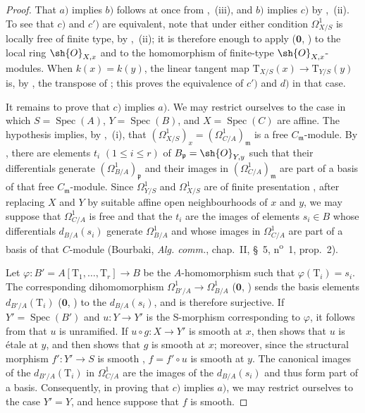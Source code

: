 \begin{proof}
That $a)$ implies $b)$ follows at once from ,~(iii), and $b)$ implies $c)$ by ,~(ii).
To see that $c)$ and $c')$ are equivalent, note that under either condition $\Omega^1_{X/S}$ is locally free of finite type, by ,~(ii); it is therefore enough to apply ($\mathbf{0}$, ) to the local ring $\sh{O}_{X,x}$ and to the homomorphism  of finite-type $\sh{O}_{X,x}$-modules.
When $k(x)=k(y)$, the linear tangent map $\mathrm{T}_{X/S}(x)\to\mathrm{T}_{Y/S}(y)$ is, by , the transpose of ; this proves the equivalence of $c')$ and $d)$ in that case.


It remains to prove that $c)$ implies $a)$.
We may restrict ourselves to the case in which $S=\operatorname{Spec}(A)$, $Y=\operatorname{Spec}(B)$, and $X=\operatorname{Spec}(C)$ are affine.
The hypothesis implies, by ,~(i), that
$(\Omega^1_{X/S})_x=(\Omega^1_{C/A})_{\mathfrak m}$ is a free $C_{\mathfrak m}$-module.
By , there are elements $t_i$ $(1\leq i\leq r)$ of
$B_{\mathfrak p}=\sh{O}_{Y,y}$ such that their differentials generate
$(\Omega^1_{B/A})_{\mathfrak p}$ and their images in
$(\Omega^1_{C/A})_{\mathfrak m}$ are part of a basis of that free $C_{\mathfrak m}$-module.
Since $\Omega^1_{Y/S}$ and $\Omega^1_{X/S}$ are of finite presentation , after replacing $X$ and $Y$ by suitable affine open neighbourhoods of $x$ and $y$, we may suppose that $\Omega^1_{C/A}$ is free and that the $t_i$ are the images of elements $s_i\in B$ whose differentials $d_{B/A}(s_i)$ generate $\Omega^1_{B/A}$ and whose images in $\Omega^1_{C/A}$ are part of a basis of that $C$-module (Bourbaki, \emph{Alg. comm.}, chap.~II, \S~5, n\textsuperscript{o}~1, prop.~2).

Let $\varphi:B'=A[\mathrm{T}_1,\ldots,\mathrm{T}_r]\to B$ be the $A$-homomorphism such that $\varphi(\mathrm{T}_i)=s_i$.
The corresponding dihomomorphism
$\Omega^1_{B'/A}\to\Omega^1_{B/A}$ ($\mathbf{0}$, ) sends the basis elements $d_{B'/A}(\mathrm{T}_i)$ ($\mathbf{0}$, ) to the $d_{B/A}(s_i)$, and is therefore surjective.
If $Y'=\operatorname{Spec}(B')$ and $u:Y\to Y'$ is the S-morphism corresponding to $\varphi$, it follows from  that $u$ is unramified.
If $u\circ g:X\to Y'$ is smooth at $x$, then  shows that $u$ is \'etale at $y$, and  then shows that $g$ is smooth at $x$; moreover, since the structural morphism $f':Y'\to S$ is smooth , $f=f'\circ u$ is smooth at $y$.
The canonical images of the $d_{B'/A}(\mathrm{T}_i)$ in $\Omega^1_{C/A}$ are the images of the $d_{B/A}(s_i)$ and thus form part of a basis.
Consequently, in proving that $c)$ implies $a)$, we may restrict ourselves to the case $Y'=Y$, and hence suppose that $f$ is smooth.


\end{proof}
